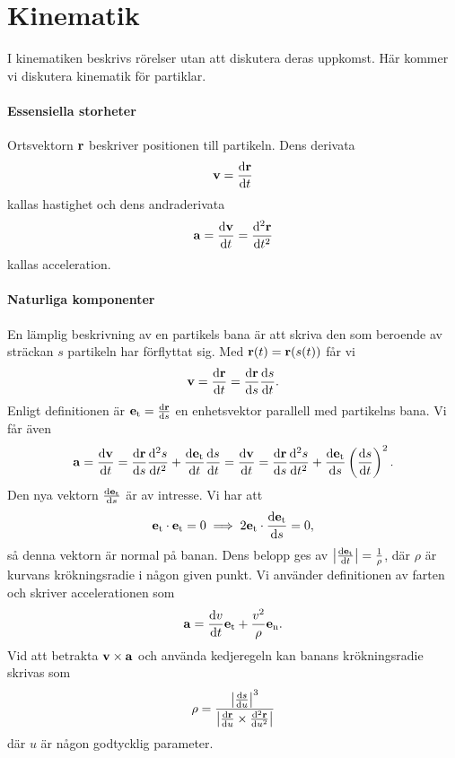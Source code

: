 \section{Kinematik}

I kinematiken beskrivs rörelser utan att diskutera deras uppkomst. Här kommer vi diskutera kinematik för partiklar.

\paragraph{Essensiella storheter}
Ortsvektorn $\vect{r}$ beskriver positionen till partikeln. Dens derivata
\begin{align*}
	\vect{v} = \dv{\vect{r}}{t}
\end{align*}
kallas hastighet och dens andraderivata
\begin{align*}
	\vect{a} = \dv{\vect{v}}{t} = \dv[2]{\vect{r}}{t}
\end{align*}
kallas acceleration.

\paragraph{Naturliga komponenter}
En lämplig beskrivning av en partikels bana är att skriva den som beroende av sträckan $s$ partikeln har förflyttat sig. Med $\vect{r}(t) = \vect{r}(s(t))$ får vi
\begin{align*}
	\vect{v} = \dv{\vect{r}}{t} = \dv{\vect{r}}{s}\dv{s}{t}.
\end{align*}
Enligt definitionen är $\vect{e}_\text{t} = \dv{\vect{r}}{s}$ en enhetsvektor parallell med partikelns bana. Vi får även
\begin{align*}
	\vect{a} = \dv{\vect{v}}{t} = \dv{\vect{r}}{s}\dv[2]{s}{t} + \dv{\vect{e}_\text{t}}{t}\dv{s}{t} = \dv{\vect{v}}{t} = \dv{\vect{r}}{s}\dv[2]{s}{t} + \dv{\vect{e}_\text{t}}{s}\left(\dv{s}{t}\right)^2.
\end{align*}
Den nya vektorn $\dv{\vect{e}_\text{t}}{s}$ är av intresse. Vi har att
\begin{align*}
	\vect{e}_\text{t}\cdot\vect{e}_\text{t} = 0 \implies 2\vect{e}_\text{t}\cdot\dv{\vect{e}_\text{t}}{s} = 0,
\end{align*}
så denna vektorn är normal på banan. Dens belopp ges av $\abs{\dv{\vect{e}_\text{t}}{t}} = \frac{1}{\rho}$, där $\rho$ är kurvans krökningsradie i någon given punkt. Vi använder definitionen av farten och skriver accelerationen som
\begin{align*}
	\vect{a} = \dv{v}{t}\vect{e}_\text{t} + \frac{v^2}{\rho}\vect{e}_\text{n}.
\end{align*}
Vid att betrakta $\vect{v}\times\vect{a}$ och använda kedjeregeln kan banans krökningsradie skrivas som
\begin{align*}
	\rho = \frac{\abs{\dv{s}{u}}^3}{\abs{\dv{\vect{r}}{u}\times\dv[2]{\vect{r}}{u}}}
\end{align*}
där $u$ är någon godtycklig parameter.

